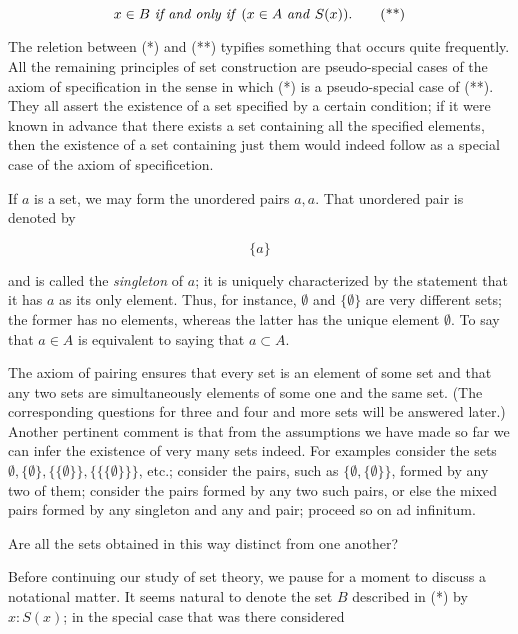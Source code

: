 \begin{equation}\label{nothing2}
x \in B \text{ \textit{if and only if} } (x \in A \text{ \textit{and} }  S(x)). \tag{**}
\end{equation}

The reletion between (*) and (**) typifies something that occurs quite frequently. All the remaining principles of set construction are pseudo-special cases of the axiom of specification in the sense in which (*) is a pseudo-special case of (**). They all assert the existence of a set specified by a certain condition; if it were known in advance that there exists a set containing all the specified elements, then the existence of a set containing just them would indeed follow as a special case of the axiom of specificetion. 

If $a$ is a set, we may form the unordered pairs ${a, a}$. That unordered pair is denoted by 

\begin{equation*}
\{ a \}
\end{equation*}

and is called the \textit{singleton} of $a$; it is uniquely characterized by the statement that it has $a$ as its only element. Thus, for instance, $ \emptyset $ and $ \{ \emptyset \}$ are very different sets; the former has no elements, whereas the latter has the unique element $ \emptyset $. To say that $a \in A$ is equivalent to saying that ${a} \subset A$. 

The axiom of pairing ensures that every set is an element of some set and that any two sets are simultaneously elements of some one and the same set. (The corresponding questions for three and four and more sets will be answered later.) Another pertinent comment is that from the assumptions we have made so far we can infer the existence of very many sets indeed. For examples  consider the sets $ \emptyset, \{ \emptyset \}, \{ \{ \emptyset \} \}, \{ \{ \{ \emptyset \} \} \} $, etc.; consider the pairs, such as  $ \{ \emptyset, \{ \emptyset \} \}$, formed by any two of them; consider the pairs formed by any two such pairs, or else the mixed pairs formed by any singleton and any and pair; proceed so on ad infinitum.

\begin{named}[EXERCISE. ] Are all the sets obtained in this way distinct from one another? 
\end{named}

Before continuing our study of set theory, we pause for a moment to discuss a notational matter. It seems natural to denote the set $B$ described in (*) by ${x: S(x)}$; in the special case that was there considered

